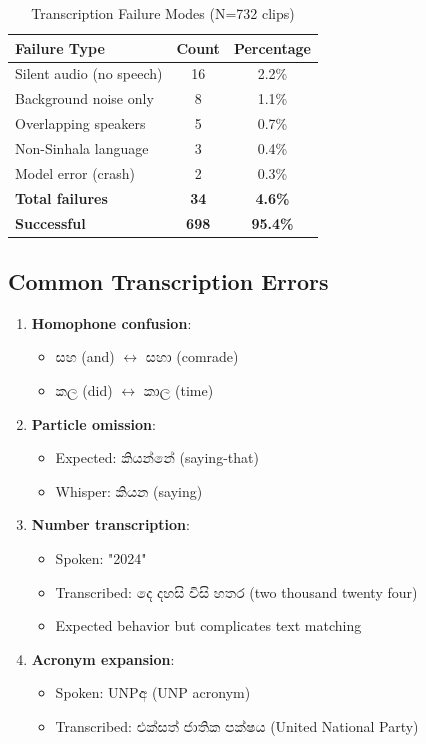 \documentclass[11pt,a4paper]{article}
\begin{document}
\begin{table}[htbp]
\centering
\caption{Transcription Failure Modes (N=732 clips)}
\begin{tabular}{@{}lcc@{}}
\toprule
\textbf{Failure Type} & \textbf{Count} & \textbf{Percentage} \\ \midrule
Silent audio (no speech) & 16 & 2.2\% \\
Background noise only & 8 & 1.1\% \\
Overlapping speakers & 5 & 0.7\% \\
Non-Sinhala language & 3 & 0.4\% \\
Model error (crash) & 2 & 0.3\% \\
\textbf{Total failures} & \textbf{34} & \textbf{4.6\%} \\
\textbf{Successful} & \textbf{698} & \textbf{95.4\%} \\
\bottomrule
\end{tabular}
\end{table}

\subsection{Common Transcription Errors}

\begin{enumerate}
    \item \textbf{Homophone confusion}:
    \begin{itemize}
        \item සහ (and) $\leftrightarrow$ සහා (comrade)
        \item කල (did) $\leftrightarrow$ කාල (time)
    \end{itemize}
    
    \item \textbf{Particle omission}:
    \begin{itemize}
        \item Expected: කියන්නේ (saying-that)
        \item Whisper: කියන (saying)
    \end{itemize}
    
    \item \textbf{Number transcription}:
    \begin{itemize}
        \item Spoken: "2024"
        \item Transcribed: දෙ දහසි විසි හතර (two thousand twenty four)
        \item Expected behavior but complicates text matching
    \end{itemize}
    
    \item \textbf{Acronym expansion}:
    \begin{itemize}
        \item Spoken: UNPඅ (UNP acronym)
        \item Transcribed: එක්සත් ජාතික පක්ෂය (United National Party)
    \end{itemize}
\end{enumerate}
\end{document}
